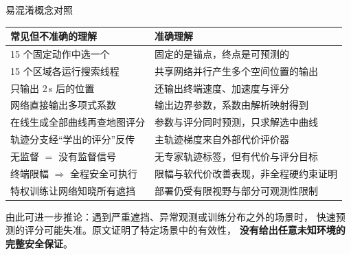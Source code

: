 \begin{frame}{易混淆概念对照}
  \scriptsize
  \begin{center}
  \begin{tabular}{@{}p{}p{}@{}}
    \toprule
    \textbf{常见但不准确的理解} & \textbf{准确理解} \\
    \midrule
    15 个固定动作中选一个 & 固定的是锚点，终点是可预测的 \\
    15 个区域各运行搜索线程 & 共享网络并行产生多个空间位置的输出 \\
    只输出 2\,s 后的位置 & 还输出终端速度、加速度与评分 \\
    网络直接输出多项式系数 & 输出边界参数，系数由解析映射得到 \\
    在线生成全部曲线再查地图评分 & 参数与评分同时预测，只求解选中曲线 \\
    轨迹分支经“学出的评分”反传 & 主轨迹梯度来自外部代价评价器 \\
    无监督 $=$ 没有监督信号 & 无专家轨迹标签，但有代价与评分目标 \\
    终端限幅 $\Rightarrow$ 全程安全可执行 & 限幅与软代价改善表现，非全程硬约束证明 \\
    特权训练让网络知晓所有遮挡 & 部署仍受有限视野与部分可观测性限制 \\
    \bottomrule
  \end{tabular}
  \end{center}
  \vspace{0.2em}
  \begin{reading}
    \scriptsize
    由此可进一步推论：遇到严重遮挡、异常观测或训练分布之外的场景时，
    快速预测的评分可能失准。原文证明了特定场景中的有效性，
    \textbf{没有给出任意未知环境的完整安全保证}。
  \end{reading}
\end{frame}

